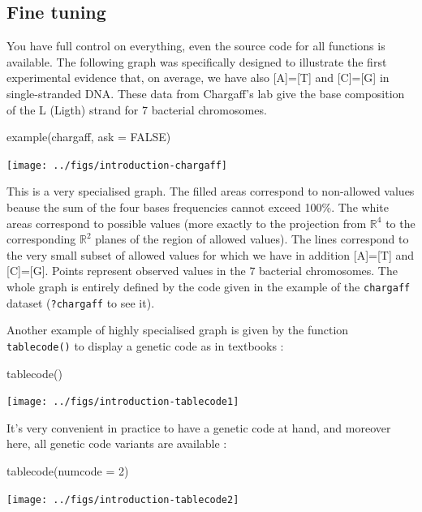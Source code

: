 \documentclass{article}
\begin{document}
\subsection{Fine tuning} 
You have full control on everything, even the source code
for all functions is available. 
The following graph was specifically designed to illustrate
the first experimental evidence \cite{chargaff} that, on average, we have also [A]=[T] and [C]=[G] 
in single-stranded DNA. These data from Chargaff's lab give the base composition of the L (Ligth) 
strand for 7 bacterial chromosomes.

\begin{Schunk}
\begin{Sinput}
 example(chargaff, ask = FALSE)
\end{Sinput}
\end{Schunk}
\texttt{[image: ../figs/introduction-chargaff]}

This is a very specialised graph. The filled areas correspond to non-allowed values beause the sum 
of the four bases frequencies cannot exceed 100\%. The white areas correspond to possible values 
(more exactly to the projection from $\mathbb{R}^4$ to the corresponding $\mathbb{R}^2$ 
planes of the region of allowed values). The lines correspond to the very small subset of allowed 
values for which we have in addition [A]=[T] and [C]=[G]. Points represent observed values in
the $7$ bacterial chromosomes. The whole graph is entirely defined by the code given in the
example of the \texttt{chargaff} dataset (\texttt{?chargaff} to see it).

Another example of highly specialised graph is given by the function \texttt{tablecode()} to
display a genetic code as in textbooks :

\begin{Schunk}
\begin{Sinput}
 tablecode()
\end{Sinput}
\end{Schunk}
\texttt{[image: ../figs/introduction-tablecode1]}

It's very convenient in practice to have a genetic code at hand, and moreover here,
all genetic code variants are available :

\begin{Schunk}
\begin{Sinput}
 tablecode(numcode = 2)
\end{Sinput}
\end{Schunk}
\texttt{[image: ../figs/introduction-tablecode2]}
\end{document}

